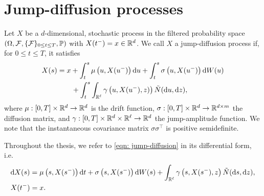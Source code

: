 \section{Jump-diffusion processes}
\label{section: Jump-diffusion processes}
Let $X$ be a $d$-dimensional, stochastic process in the filtered probability space \newline $(\Omega, \mathcal{F}, \{\mathcal{F}\}_{0 \leq t \leq T}, \mathbb{P})$ with $X(t^-)=x \in \mathbb{R}^d$. We call $X$ a jump-diffusion process if, for $0 \leq t \leq T$, it satisfies
\begin{align}
    X(s) &= x + \int_t^s \mu\left(u,X(u^-)\right) \mathrm{d} u + \int_t^s \sigma\left(u,X(u^-)\right) \mathrm{d} W(u) \nonumber \\
    & \qquad + \int_t^s \int_{\mathbb{R}^\ell} \gamma\left(u,X(u^-),z)\right) \tilde N(\mathrm{d} u, \mathrm{d} z),
    \label{eqn: jump-diffusion}
\end{align}
where $\mu: [0,T]\times \mathbb{R}^d \rightarrow \mathbb{R}^d$ is the drift function, $\sigma: [0,T] \times \mathbb{R}^d \rightarrow \mathbb{R}^{d\times m}$ the diffusion matrix, and $\gamma: [0,T]\times \mathbb{R}^d \times \mathbb{R}^\ell \rightarrow \mathbb{R}^d$ the jump-amplitude function. We note that the instantaneous covariance matrix $\sigma\sigma^\top$ is positive semidefinite. 

Throughout the thesis, we refer to \eqref{eqn: jump-diffusion} in its differential form, i.e.
\begin{align}
    &\mathrm{d} X(s) = \mu\left(s, X(s^-)\right) \mathrm{d} t + \sigma\left(s,X(s^-) \right) \mathrm{d} W(s) + \int_{\mathbb{R}^\ell} \gamma \left(s,X(s^-),z \right) \tilde N (\mathrm{d} s, \mathrm{d} z),\nonumber\\
    &X(t^-)=x.
    \label{eqn: jump-diffusion SDE chapter 2}
\end{align}

